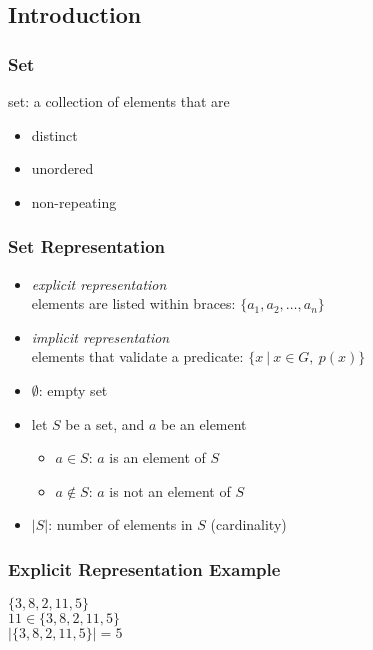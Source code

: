 \documentclass[dvipsnames]{beamer}
\begin{document}
\subsection{Introduction}

\begin{frame}
  \frametitle{Set}

  \begin{definition}
    \alert{set}: a collection of elements that are
    \begin{itemize}
      \item distinct
      \item unordered
      \item non-repeating
    \end{itemize}
  \end{definition}
\end{frame}

\begin{frame}
  \frametitle{Set Representation}

  \begin{itemize}
    \item \emph{explicit representation}\\
      elements are listed within braces: $\{a_1, a_2, \dots, a_n\}$

    \pause
    \medskip
    \item \emph{implicit representation}\\
      elements that validate a predicate: $\{x~|~x \in G,~p(x)\}$

    \pause
    \medskip
    \item $\emptyset$: empty set

    \pause
    \medskip
    \item let $S$ be a set, and $a$ be an element
    \begin{itemize}
      \item $a \in S$: $a$ is an element of $S$
      \item $a \notin S$: $a$ is not an element of $S$
    \end{itemize}

    \pause
    \medskip
    \item $|S|$: number of elements in $S$ (\alert{cardinality})
  \end{itemize}
\end{frame}

\begin{frame}
  \frametitle{Explicit Representation Example}

  \begin{example}
    $\{3,8,2,11,5\}$\\
    $11 \in \{3,8,2,11,5\}$\\
    $|\{3,8,2,11,5\}|=5$
  \end{example}
\end{frame}
\end{document}
